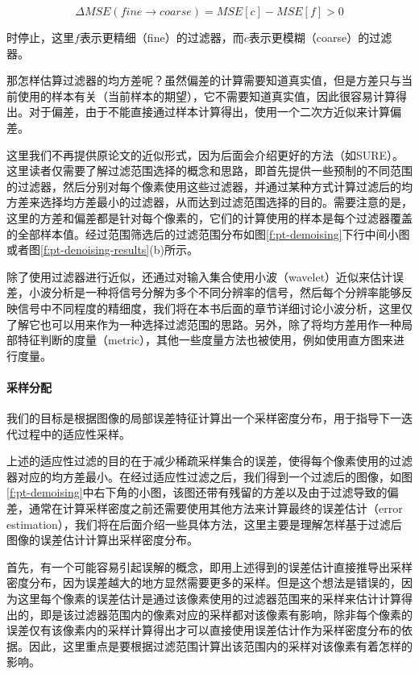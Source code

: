 \begin{equation}
	\Delta MSE(fine\rightarrow coarse)=MSE[c]-MSE[f]>0
\end{equation}

\noindent 时停止，这里$f$表示更精细（fine）的过滤器，而$c$表示更模糊（coarse）的过滤器。

那怎样估算过滤器的均方差呢？虽然偏差的计算需要知道真实值，但是方差只与当前使用的样本有关（当前样本的期望），它不需要知道真实值，因此很容易计算得出。对于偏差，由于不能直接通过样本计算得出，\cite{a:AdaptiveSamplingandReconstructionusingGreedyErrorMinimization}使用一个二次方近似来计算偏差。

这里我们不再提供原论文的近似形式，因为后面会介绍更好的方法（如SURE）。这里读者仅需要了解过滤范围选择的概念和思路，即首先提供一些预制的不同范围的过滤器，然后分别对每个像素使用这些过滤器，并通过某种方式计算过滤后的均方差来选择均方差最小的过滤器，从而达到过滤范围选择的目的。需要注意的是，这里的方差和偏差都是针对每个像素的，它们的计算使用的样本是每个过滤器覆盖的全部样本值。经过范围筛选后的过滤范围分布如图\ref{f:pt-demoising}下行中间小图或者图\ref{f:pt-denoising-results}(b)所示。

除了使用过滤器进行近似，\cite{a:AdaptiveWaveletRendering}还通过对输入集合使用小波（wavelet）近似来估计误差，小波分析是一种将信号分解为多个不同分辨率的信号，然后每个分辨率能够反映信号中不同程度的精细度，我们将在本书后面的章节详细讨论小波分析，这里仅了解它也可以用来作为一种选择过滤范围的思路。另外，除了将均方差用作一种局部特征判断的度量（metric），其他一些度量方法也被使用，例如\cite{a:BoostingMonteCarloRenderingbyRayHistogramFusion}使用直方图来进行度量。






\paragraph{采样分配}
我们的目标是根据图像的局部误差特征计算出一个采样密度分布，用于指导下一迭代过程中的适应性采样。

上述的适应性过滤的目的在于减少稀疏采样集合的误差，使得每个像素使用的过滤器对应的均方差最小。在经过适应性过滤之后，我们得到一个过滤后的图像，如图\ref{f:pt-demoising}中右下角的小图，该图还带有残留的方差以及由于过滤导致的偏差，通常在计算采样密度之前还需要使用其他方法来计算最终的误差估计（error estimation），我们将在后面介绍一些具体方法，这里主要是理解怎样基于过滤后图像的误差估计计算出采样密度分布。

首先，有一个可能容易引起误解的概念，即用上述得到的误差估计直接推导出采样密度分布，因为误差越大的地方显然需要更多的采样。但是这个想法是错误的，因为这里每个像素的误差估计是通过该像素使用的过滤器范围来的采样来估计计算得出的，即是该过滤器范围内的像素对应的采样都对该像素有影响，除非每个像素的误差仅有该像素内的采样计算得出才可以直接使用误差估计作为采样密度分布的依据。因此，这里重点是要根据过滤范围计算出该范围内的采样对该像素有着怎样的影响。

